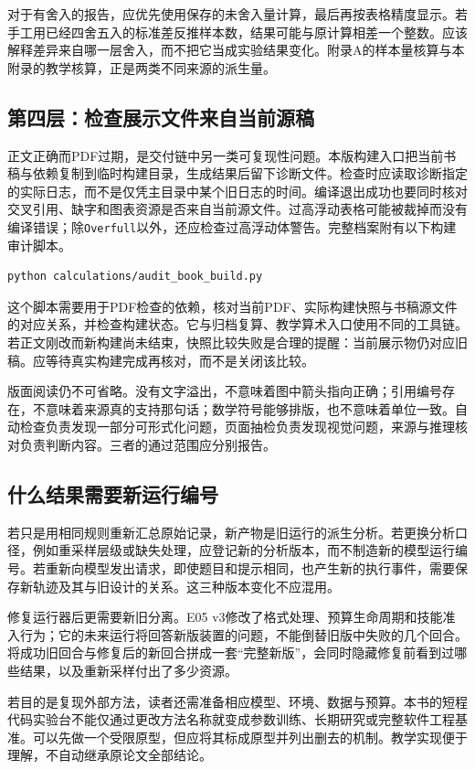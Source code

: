 对于有舍入的报告，应优先使用保存的未舍入量计算，最后再按表格精度显示。若手工用已经四舍五入的标准差反推样本数，结果可能与原计算相差一个整数。应该解释差异来自哪一层舍入，而不把它当成实验结果变化。附录A的样本量核算与本附录的教学核算，正是两类不同来源的派生量。

\subsection{第四层：检查展示文件来自当前源稿}

正文正确而PDF过期，是交付链中另一类可复现性问题。本版构建入口把当前书稿与依赖复制到临时构建目录，生成结果后留下诊断文件。检查时应读取诊断指定的实际日志，而不是仅凭主目录中某个旧日志的时间。编译退出成功也要同时核对交叉引用、缺字和图表资源是否来自当前源文件。过高浮动表格可能被裁掉而没有编译错误；除\texttt{Overfull}以外，还应检查过高浮动体警告。完整档案附有以下构建审计脚本。

\begin{verbatim}
python calculations/audit_book_build.py
\end{verbatim}

这个脚本需要用于PDF检查的依赖，核对当前PDF、实际构建快照与书稿源文件的对应关系，并检查构建状态。它与归档复算、教学算术入口使用不同的工具链。若正文刚改而新构建尚未结束，快照比较失败是合理的提醒：当前展示物仍对应旧稿。应等待真实构建完成再核对，而不是关闭该比较。

版面阅读仍不可省略。没有文字溢出，不意味着图中箭头指向正确；引用编号存在，不意味着来源真的支持那句话；数学符号能够排版，也不意味着单位一致。自动检查负责发现一部分可形式化问题，页面抽检负责发现视觉问题，来源与推理核对负责判断内容。三者的通过范围应分别报告。

\subsection{什么结果需要新运行编号}

若只是用相同规则重新汇总原始记录，新产物是旧运行的派生分析。若更换分析口径，例如重采样层级或缺失处理，应登记新的分析版本，而不制造新的模型运行编号。若重新向模型发出请求，即使题目和提示相同，也产生新的执行事件，需要保存新轨迹及其与旧设计的关系。这三种版本变化不应混用。

修复运行器后更需要新旧分离。E05 v3修改了格式处理、预算生命周期和技能准入行为；它的未来运行将回答新版装置的问题，不能倒替旧版中失败的几个回合。将成功旧回合与修复后的新回合拼成一套“完整新版”，会同时隐藏修复前看到过哪些结果，以及重新采样付出了多少资源。

若目的是复现外部方法，读者还需准备相应模型、环境、数据与预算。本书的短程代码实验台不能仅通过更改方法名称就变成参数训练、长期研究或完整软件工程基准。可以先做一个受限原型，但应将其标成原型并列出删去的机制。教学实现便于理解，不自动继承原论文全部结论。


